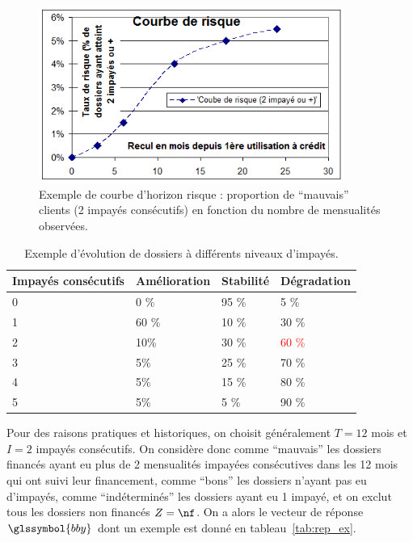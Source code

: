 \begin{figure}
\centering
\includegraphics[width=10cm]{figures/chapitre1/courbe_risque.png}
\caption{\label{fig:courbe_horizon} Exemple de courbe d'horizon risque : proportion de ``mauvais'' clients (2 impayés consécutifs) en fonction du nombre de mensualités observées.}
\end{figure}

\begin{table}
\centering
\begin{tabular}{l|l|l|l}
Impayés consécutifs & Amélioration & Stabilité & Dégradation \\
\hline
0 & 0 \% & 95 \% & 5 \%  \\
1 & 60 \% & 10 \% & 30 \%  \\
2 & 10\% & 30 \% & \textcolor{red}{60 \%} \\
3 & 5\% & 25 \% & {70 \%} \\
4 & 5\% & 15 \% & {80 \%} \\
5 & 5\% & 5 \% & {90 \%} \\
\end{tabular}
\caption{\label{tab:impayes} Exemple d'évolution de dossiers à différents niveaux d'impayés.} 
\end{table}




Pour des raisons pratiques et historiques, on choisit généralement $T=12$ mois et $I = 2$ impayés consécutifs. On considère donc comme ``mauvais'' les dossiers financés ayant eu plus de 2 mensualités impayées consécutives dans les 12 mois qui ont suivi leur financement, comme ``bons'' les dossiers n'ayant pas eu d'impayés, comme ``indéterminés'' les dossiers ayant eu 1 impayé, et on exclut tous les dossiers non financés $Z=\nf$. On a alors le vecteur de réponse $\glssymbol{bby}$ dont un exemple est donné en tableau~\ref{tab:rep_ex}.


